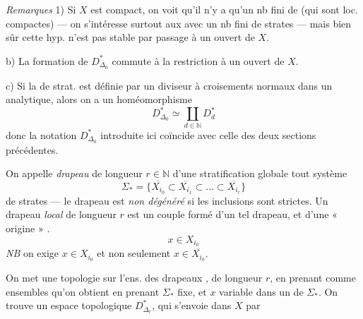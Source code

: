 \documentclass[11pt,a4paper]{article}
\begin{document}

\emph{Remarques} 1) Si $X$ est compact, on voit qu'il n'y a qu'un nb fini de   (qui sont loc. compactes) --- on s'intéresse surtout aux   avec un nb fini de strates --- mais bien sûr cette hyp. n'est pas stable par passage à un ouvert de $X$.

b) La formation de $D^{*}_{\Delta_0}$ commute à la restriction à un ouvert de $X$.

c) Si la \struck{\ill{}}  de strat. est définie par un diviseur à croisements normaux dans un  analytique, alors on a un homéomorphisme
\[
  D^{*}_{\Delta_0} \simeq \coprod_{d \in \mathbb{N}} D^{*}_{d} \tag{298}
\]
donc la notation $D^{*}_{\Delta_0}$ introduite ici coïncide avec celle des \struck{\ill{}} deux sections précédentes.


On appelle \emph{drapeau} de longueur $r \in \mathbb{N}$ d'une stratification globale tout système
\[
  \Sigma_* = \{\overline{X_{i_0}} \subset \overline{X_{i_1}} \subset \dots \subset \overline{X_{i_r}}\} \tag{299}
\]
de strates --- le drapeau est \emph{non dégénéré} si les inclusions sont strictes. Un drapeau \emph{local}  de longueur $r$ est un  couple formé d'un tel drapeau, et d'une « origine » .
\[
  x \in X_{i_0} \tag{300}
\]
\emph{NB} on exige $x \in X_{i_0}$ et non seulement $x \in \overline{X_{i_0}}$.

 

On met une topologie sur l'ens. des drapeaux  , de longueur $r$, en prenant comme   ensembles qu'on obtient en prenant $\Sigma_*$ fixe, et $x$ variable dans un  de $\Sigma_*$. On trouve un espace topologique $D^{*}_{\Delta_r}$, qui s'envoie dans $X$ par
\end{document}

